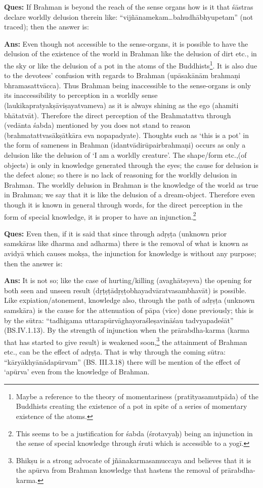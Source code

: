 \textbf{Ques:} If Brahman is beyond the reach of the sense organs how is it that śāstras declare worldly delusion therein like: “vijñānamekam…bahu\-dhābhyupetam” (not traced); then the answer is:

\textbf{Ans:} Even though not accessible to the sense-organs, it is possible to have the delusion of the existence of the world in Brahman like the delusion of dirt etc., in the sky or like the delusion of a pot in the atoms of the Buddhists\footnote{Maybe a reference to the theory of momentariness (pratītyasamutpāda) of the Buddhists creating the existence of a pot in spite of a series of momentary existence of the atoms.}. It is also due to the devotees’ confusion with regards to Brahman (upāsakānām brahmaṇi bhramasattvācca). Thus Brahman being inaccessible to the sense-organs is only its inaccessibility to perception in a worldly sense (laukikapratyakṣāviṣayatvameva) as it is always shining as the ego (ahamiti bhātatvāt). Therefore the direct perception of the Brahmatattva through (vedānta śabda) mentioned by you does not stand to reason (brahmatattvasākṣātkāra eva nopapadyate). Thoughts such as ‘this is a pot’ in the form of sameness in Brahman (idantvādirūpairbrahmaṇi) occurs as only a delusion like the delusion of ‘I am a worldly creature’. The shape/form etc.,(of objects) is only in knowledge generated through the eyes; the cause for delusion is the defect alone; so there is no lack of reasoning for the worldly delusion in Brahman. The worldly delusion in Brahman is the knowledge of the world as true in Brahman; we say that it is like the delusion of a dream-object. Therefore even though it is known in general through words, for the direct perception in the form of special knowledge, it is proper to have an injunction.\footnote{This seems to be a justification for śabda (śrotavyaḥ) being an injunction in the sense of special knowledge through śruti which is accessible to a yogī.}

\vskip -3pt

\textbf{Ques:} Even then, if it is said that since through adṛṣṭa (unknown prior samskāras like dharma and adharma) there is the removal of what is known as avidyā which causes mokṣa, the injunction for knowledge is without any purpose; then the answer is:

\vskip -3pt

\textbf{Ans:} It is not so; like the case of hurting/killing (avaghātsyeva) the opening for both seen and unseen result (dṛṭṣṭādṛṣṭobhayadvāratva\-sambhavāt) is  possible. Like expiation/atonement, knowledge also, through the path of adṛṣṭa (unknown samskāra) is the cause for the attenuation of pāpa (vice) done previously; this is by the sūtra: “tadhigama uttarapūrvāghayoraśleṣavināśau tadvyapadeśāt” (BS.IV.1.13). By the strength of injunction when the prārabdha-karma (karma that has started to give result) is weakened soon,\footnote{Bhikṣu is a strong advocate of jñānakarmasamuccaya and believes that it is the apūrva from Brahman knowledge that hastens the removal of prārabdha-karma.} the attainment of Brahman etc., can be the effect of adṛṣṭa. That is why through the coming sūtra: “kāryākhyānādapūrvam” (BS. III.3.18) there will be mention of the effect of ‘apūrva’ even from the knowledge of Brahman.

